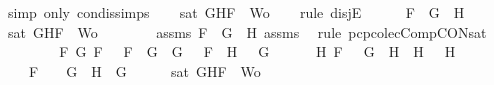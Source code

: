 \begin{isabellebody}
\ {\isacharparenleft}simp\ only{\isacharcolon}\ con{\isacharunderscore}dis{\isacharunderscore}simps{\isacharparenleft}{}{\isacharparenright}{\isacharparenright}\isanewline
\ \ \isamarkupfalse%
\ {\isachardoublequoteopen}sat\ {\isacharparenleft}{\isacharbraceleft}G{\isacharcomma}H{\isacharcomma}F{\isacharbraceright}\ {\isasymunion}\ Wo{\isacharparenright}{\isachardoublequoteclose}\isanewline
\ \ \isamarkupfalse%
\ {\isacharparenleft}rule\ disjE{\isacharparenright}\isanewline
\ \ \ \ \isamarkupfalse%
\ {\isachardoublequoteopen}F\ {\isacharequal}\ G\ \isactrlbold {\isasymand}\ H{\isachardoublequoteclose}\isanewline
\ \ \ \ \isamarkupfalse%
\ {\isachardoublequoteopen}sat\ {\isacharparenleft}{\isacharbraceleft}G{\isacharcomma}H{\isacharcomma}F{\isacharbraceright}\ {\isasymunion}\ Wo{\isacharparenright}{\isachardoublequoteclose}\isanewline
\ \ \ \ \ \ \isamarkupfalse%
\ assms{\isacharparenleft}{}{\isacharparenright}\ {\isacartoucheopen}F\ {\isacharequal}\ G\ \isactrlbold {\isasymand}\ H{\isacartoucheclose}\ assms{\isacharparenleft}{}{\isacharcomma}{}{\isacharcomma}{}{\isacharparenright}\ \isamarkupfalse%
\ {\isacharparenleft}rule\ pcp{\isacharunderscore}colecComp{\isacharunderscore}CON{\isacharunderscore}sat{}{\isacharparenright}\isanewline
\ \ \isamarkupfalse%
\isanewline
\ \ \ \ \isamarkupfalse%
\ {\isachardoublequoteopen}{\isacharparenleft}{\isasymexists}F{}\ G{}{\isachardot}\ F\ {\isacharequal}\ \isactrlbold {\isasymnot}\ {\isacharparenleft}F{}\ \isactrlbold {\isasymor}\ G{}{\isacharparenright}\ {\isasymand}\ G\ {\isacharequal}\ \isactrlbold {\isasymnot}\ F{}\ {\isasymand}\ H\ {\isacharequal}\ \isactrlbold {\isasymnot}\ G{}{\isacharparenright}\ {\isasymor}\ \isanewline
\ \ \ \ {\isacharparenleft}{\isasymexists}H{}{\isachardot}\ F\ {\isacharequal}\ \isactrlbold {\isasymnot}\ {\isacharparenleft}G\ \isactrlbold {\isasymrightarrow}\ H{}{\isacharparenright}\ {\isasymand}\ H\ {\isacharequal}\ \isactrlbold {\isasymnot}\ H{}{\isacharparenright}\ {\isasymor}\ \isanewline
\ \ \ \ F\ {\isacharequal}\ \isactrlbold {\isasymnot}\ {\isacharparenleft}\isactrlbold {\isasymnot}\ G{\isacharparenright}\ {\isasymand}\ H\ {\isacharequal}\ G{\isachardoublequoteclose}\isanewline
\ \ \ \ \isamarkupfalse%
\ {\isachardoublequoteopen}sat\ {\isacharparenleft}{\isacharbraceleft}G{\isacharcomma}H{\isacharcomma}F{\isacharbraceright}\ {\isasymunion}\ Wo{\isacharparenright}{\isachardoublequoteclose}\isanewline

\end{isabellebody}
